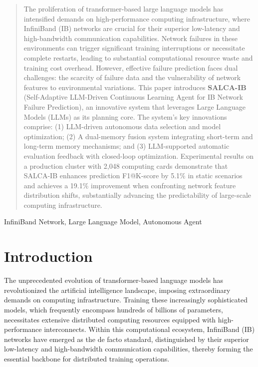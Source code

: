 \documentclass[conference]{IEEEtran}
\begin{document}
\begin{abstract}
The proliferation of transformer-based large language models has intensified demands on high-performance computing infrastructure, where InfiniBand (IB) networks are crucial for their superior low-latency and high-bandwidth communication capabilities. Network failures in these environments can trigger significant training interruptions or necessitate complete restarts, leading to substantial computational resource waste and training cost overhead. However, effective failure prediction faces dual challenges: the scarcity of failure data and the vulnerability of network features to environmental variations. This paper introduces \textbf{SALCA-IB} (Self-Adaptive LLM-Driven Continuous Learning Agent for IB Network Failure Prediction), an innovative system that leverages Large Language Models (LLMs) as its planning core. The system's key innovations comprise: (1) LLM-driven autonomous data selection and model optimization; (2) A dual-memory fusion system integrating short-term and long-term memory mechanisms; and (3) LLM-supported automatic evaluation feedback with closed-loop optimization. Experimental results on a production cluster with 2,048 computing cards demonstrate that SALCA-IB enhances prediction F1@K-score by 5.1\% in static scenarios and achieves a 19.1\% improvement when confronting network feature distribution shifts, substantially advancing the predictability of large-scale computing infrastructure.
\end{abstract}

\begin{IEEEkeywords}
    InfiniBand Network, Large Language Model, Autonomous Agent
\end{IEEEkeywords}

\section{Introduction}
The unprecedented evolution of transformer-based language models has revolutionized the artificial intelligence landscape, imposing extraordinary demands on computing infrastructure. Training these increasingly sophisticated models, which frequently encompass hundreds of billions of parameters, necessitates extensive distributed computing resources equipped with high-performance interconnects. Within this computational ecosystem, InfiniBand (IB) networks have emerged as the de facto standard, distinguished by their superior low-latency and high-bandwidth communication capabilities, thereby forming the essential backbone for distributed training operations.
\end{document}
